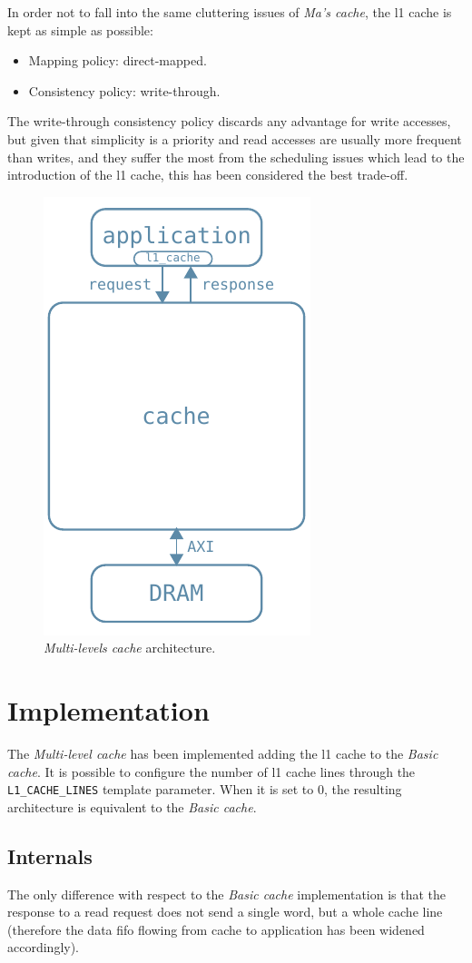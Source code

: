 \documentclass[11pt,a4paper,oneside]{memoir}
\begin{document}
In order not to fall into the same cluttering issues of \emph{Ma's cache}, the
\ac{l1} cache is kept as simple as possible:
\begin{itemize}
	\item Mapping policy: direct-mapped.
	\item Consistency policy: write-through.
\end{itemize}

The write-through consistency policy discards any advantage for write accesses,
but given that simplicity is a priority and read accesses are usually more
frequent than writes, and they suffer the most from the scheduling issues which
lead to the introduction of the \ac{l1} cache, this has been considered the
best trade-off.

\begin{figure}[!htb]
	\centering
	\includegraphics[width=.3\textwidth]{l1_arch}
	\caption{\emph{Multi-levels cache} architecture.}
	\label{fig:l1_arch}
\end{figure}

\section{Implementation}
The \emph{Multi-level cache} has been implemented adding the \ac{l1} cache to
the \emph{Basic cache}.
It is possible to configure the number of \ac{l1} cache lines through the
\texttt{L1\_CACHE\_LINES} template parameter.
When it is set to 0, the resulting architecture is equivalent to the \emph{Basic
cache}.

\subsection{Internals}
The only difference with respect to the \emph{Basic cache} implementation is
that the response to a read request does not send a single word, but a whole
cache line (therefore the data \ac{fifo} flowing from cache to application
has been widened accordingly).
\end{document}

